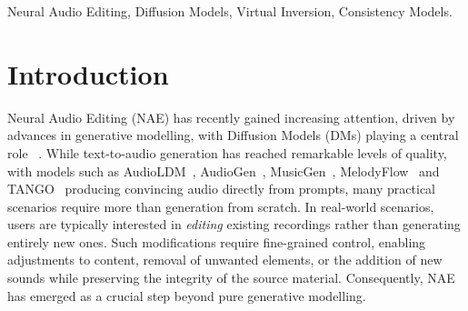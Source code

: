 \def\x{{\bm{x}}}
\def\eps{{\bm{\varepsilon}}}
\ninept
\maketitle

\begin{abstract}

Free-form, text-based audio editing remains a persistent challenge, despite progress in inversion-based neural methods. Current approaches rely on slow inversion procedures, limiting their practicality. We present a virtual-consistency based audio editing system that bypasses inversion by adapting the sampling process of diffusion models. Our pipeline is model-agnostic, requiring no fine-tuning or architectural changes, and achieves substantial speed-ups over recent neural editing baselines. Crucially, it achieves this efficiency without compromising quality, as demonstrated by quantitative benchmarks and a user study involving 16 participants.

\end{abstract}

\begin{keywords}
Neural Audio Editing, Diffusion Models, Virtual Inversion, Consistency Models. 
\end{keywords}

\section{Introduction}\label{sec:intro}

Neural Audio Editing (NAE) has recently gained increasing attention, driven by advances in generative modelling, with Diffusion Models (DMs) playing a central role ~\cite{liu2024visual, Liu2023AudioLDM2L}. 
While text-to-audio generation has reached remarkable levels of quality, with models such as {AudioLDM}~\cite{liu2023audioldm,Liu2023AudioLDM2L}, {AudioGen}~\cite{kreuk2022audiogen}, {MusicGen}~\cite{copet2024simple}, {MelodyFlow}~\cite{lan2024highfidelitytextguidedmusic} and {TANGO}~\cite{ghosal2023tango} producing convincing audio directly from prompts, many practical scenarios require more than generation from scratch. 
In real-world scenarios, users are typically interested in \emph{editing} existing recordings rather than generating entirely new ones. Such modifications require fine-grained control, enabling adjustments to content, removal of unwanted elements, or the addition of new sounds while preserving the integrity of the source material. Consequently, NAE has emerged as a crucial step beyond pure generative modelling.

